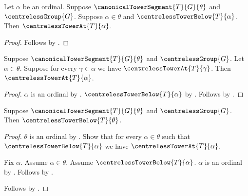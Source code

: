 \begin{proposition}\label{canonical_centreless_tower_step}
    Let $\alpha$ be an ordinal.
    Suppose $\canonicalTowerSegment{T}{G}{\theta}$ and
        $\centrelessGroup{G}$.
    Suppose $\alpha\in\theta$ and
        $\centrelessTowerBelow{T}{\alpha}$.
    Then $\centrelessTowerAt{T}{\alpha}$.
\end{proposition}
\begin{proof}
    Follows by
        .
\end{proof}

\begin{proposition}\label{canonical_centreless_tower_induction_step}
    Suppose $\canonicalTowerSegment{T}{G}{\theta}$ and
        $\centrelessGroup{G}$.
    Let $\alpha\in\theta$.
    Suppose for every $\gamma\in\alpha$ we have
        $\centrelessTowerAt{T}{\gamma}$.
    Then $\centrelessTowerAt{T}{\alpha}$.
\end{proposition}
\begin{proof}
    $\alpha$ is an ordinal by
        .
    $\centrelessTowerBelow{T}{\alpha}$ by
        .
    Follows by .
\end{proof}

\begin{theorem}\label{canonical_centreless_tower_below}
    Suppose $\canonicalTowerSegment{T}{G}{\theta}$ and
        $\centrelessGroup{G}$.
    Then $\centrelessTowerBelow{T}{\theta}$.
\end{theorem}
\begin{proof}
    $\theta$ is an ordinal by
        .
    Show that for every $\alpha\in\theta$ such that
        $\centrelessTowerBelow{T}{\alpha}$ we have
        $\centrelessTowerAt{T}{\alpha}$.
    \begin{subproof}
        Fix $\alpha$.
        Assume $\alpha\in\theta$.
        Assume $\centrelessTowerBelow{T}{\alpha}$.
        $\alpha$ is an ordinal by
            .
        Follows by .
    \end{subproof}
    Follows by .
\end{proof}

